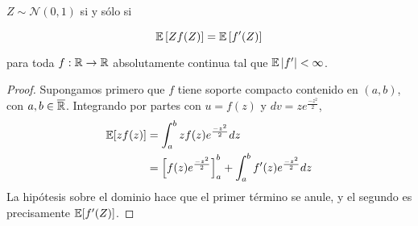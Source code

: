 \documentclass[main.tex]{subfiles}
\begin{document}
\begin{theorem}
    $Z \sim \mathcal{N}(0, 1)$ si y sólo si 

    \begin{equation*}
        \operatorname{\mathbb{E}}\left[Zf(Z)\right] = \operatorname{\mathbb{E}}\left[f'(Z)\right]
    \end{equation*}
    
    para toda $f: \operatorname{\mathbb{R}} \to \operatorname{\mathbb{R}}$ absolutamente continua tal que $\operatorname{\mathbb{E}} | f' | < \infty$.
    \begin{proof}
        Supongamos primero que $f$ tiene soporte compacto contenido en $(a, b)$, con $a, b \in \overline{\operatorname{\mathbb{R}}}$. Integrando por partes con $u=f(z)$ y $dv = ze^{\frac{-z^2}{2}}$,
        \begin{align}\label{eq:stein-parts}
        \begin{split}
            \operatorname{\mathbb{E}}[zf(z)] &= \int_a^b zf(z)e^{\frac{-z^2}{2}}dz \\
                &= \left[f(z)e^{\frac{-z^2}{2}} \right]_a^b 
                    + \int_a^b f'(z)e^{\frac{-z^2}{2}}dz
        \end{split}
        \end{align}
        La hipótesis sobre el dominio hace que el primer término se anule, y el segundo es precisamente $\operatorname{\mathbb{E}}[f'(Z)]$. 


\end{proof}
\end{theorem}
\end{document}
